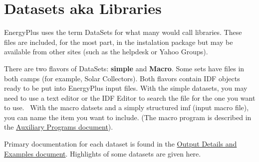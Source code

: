 \section{Datasets aka Libraries}\label{datasets-aka-libraries}

EnergyPlus uses the term DataSets for what many would call libraries. These files are included, for the most part, in the instalation package but may be available from other sites (such as the helpdesk or Yahoo Groups).

There are two flavors of DataSets: \textbf{simple} and \textbf{Macro}. Some sets have files in both camps (for example, Solar Collectors). Both flavors contain IDF objects ready to be put into EnergyPlus input files. With the simple datasets, you may need to use a text editor or the IDF Editor to search the file for the one you want to use.~ With the macro datsets and a simply structured imf (input macro file), you can name the item you want to include. (The macro program is described in the \href{AuxiliaryPrograms.pdf}{Auxiliary Programs document}).

Primary documentation for each dataset is found in the \href{OutputDetailsAndExamples.pdf}{Output Details and Examples document}. Highlights of some datasets are given here.
